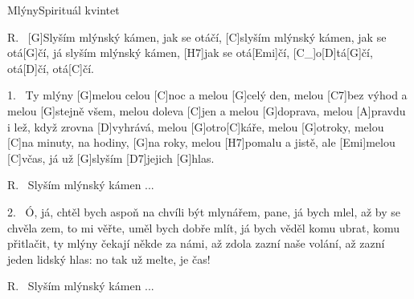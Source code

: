 \begin{song}{Mlýny}{Spirituál kvintet}

\begin{xverse}{R.~}
[\large G]Slyším mlýnský kámen, jak se otáčí,
[\large C]slyším mlýnský kámen, jak se otá[\large G]{čí},
já slyším mlýnský kámen, [\large H7]jak se otá[\large Emi]{čí},
[\large C_]o[\large D]tá[\large G]{čí}, otá[\large D]{čí}, otá[\large C]{čí}.
\end{xverse}

\begin{xverse}{1.~}
Ty mlýny [\large G]melou celou [\large C]noc a melou [\large G]celý den,
melou [\large C7]bez výhod a melou [\large G]stejně všem,
melou doleva [\large C]jen a melou [\large G]doprava,
melou [\large A]pravdu i lež, když zrovna [\large D]vyhrává,
melou [\large G]otro[\large C]káře, melou [\large G]otroky,
melou [\large C]na minuty, na hodiny, [\large G]na roky,
melou [\large H7]pomalu a jistě, ale [\large Emi]melou [\large C]včas,
já už [\large G]slyším [\large D7]jejich [\large G]hlas.
\end{xverse}

\begin{xverse}{R.~}
Slyším mlýnský kámen ...
\end{xverse}

\begin{xverse}{2.~}
Ó, já, chtěl bych aspoň na chvíli být mlynářem,
pane, já bych mlel, až by se chvěla zem,
to mi věřte, uměl bych dobře mlít,
já bych věděl komu ubrat, komu přitlačit,
ty mlýny čekají někde za námi, až zdola zazní naše volání,
až zazní jeden lidský hlas: no tak už melte, je čas!
\end{xverse}

\begin{xverse}{R.~}
Slyším mlýnský kámen ...
\end{xverse}

\end{song}

